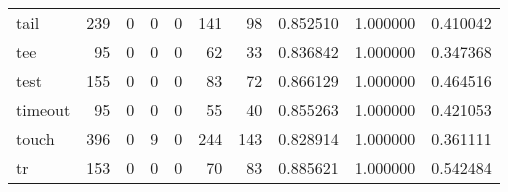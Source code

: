 \begin{longtable}{lrrrrrrrrr}
tail      &                                   239 &                                                  0 &                                                  0 &                                                  0 &                                                141 &                                                 98 &                                           0.852510 &                               1.000000 &                             0.410042 \\
tee       &                                    95 &                                                  0 &                                                  0 &                                                  0 &                                                 62 &                                                 33 &                                           0.836842 &                               1.000000 &                             0.347368 \\
test      &                                   155 &                                                  0 &                                                  0 &                                                  0 &                                                 83 &                                                 72 &                                           0.866129 &                               1.000000 &                             0.464516 \\
timeout   &                                    95 &                                                  0 &                                                  0 &                                                  0 &                                                 55 &                                                 40 &                                           0.855263 &                               1.000000 &                             0.421053 \\
touch     &                                   396 &                                                  0 &                                                  9 &                                                  0 &                                                244 &                                                143 &                                           0.828914 &                               1.000000 &                             0.361111 \\
tr        &                                   153 &                                                  0 &                                                  0 &                                                  0 &                                                 70 &                                                 83 &                                           0.885621 &                               1.000000 &                             0.542484 \\

\end{longtable}
